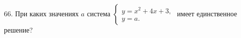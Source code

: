 66. При каких значениях $a$ система $\begin{cases} y=x^2+4x+3,\\ y=a.\end{cases}$ имеет единственное решение?\\

